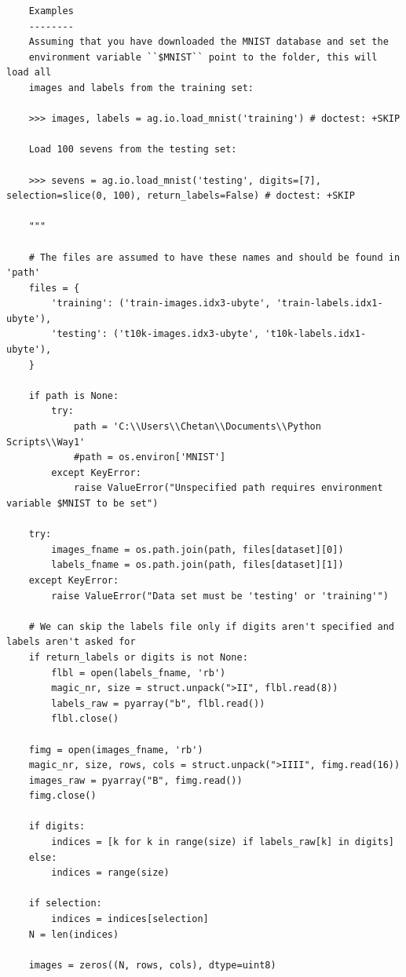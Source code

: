 \documentclass{article}
\begin{document}
\begin{lstlisting}
    Examples
    --------
    Assuming that you have downloaded the MNIST database and set the
    environment variable ``$MNIST`` point to the folder, this will load all
    images and labels from the training set:

    >>> images, labels = ag.io.load_mnist('training') # doctest: +SKIP

    Load 100 sevens from the testing set:    

    >>> sevens = ag.io.load_mnist('testing', digits=[7], selection=slice(0, 100), return_labels=False) # doctest: +SKIP

    """

    # The files are assumed to have these names and should be found in 'path'
    files = {
        'training': ('train-images.idx3-ubyte', 'train-labels.idx1-ubyte'),
        'testing': ('t10k-images.idx3-ubyte', 't10k-labels.idx1-ubyte'),
    }

    if path is None:
        try:
            path = 'C:\\Users\\Chetan\\Documents\\Python Scripts\\Way1'
            #path = os.environ['MNIST']
        except KeyError:
            raise ValueError("Unspecified path requires environment variable $MNIST to be set")

    try:
        images_fname = os.path.join(path, files[dataset][0])
        labels_fname = os.path.join(path, files[dataset][1])
    except KeyError:
        raise ValueError("Data set must be 'testing' or 'training'")

    # We can skip the labels file only if digits aren't specified and labels aren't asked for
    if return_labels or digits is not None:
        flbl = open(labels_fname, 'rb')
        magic_nr, size = struct.unpack(">II", flbl.read(8))
        labels_raw = pyarray("b", flbl.read())
        flbl.close()

    fimg = open(images_fname, 'rb')
    magic_nr, size, rows, cols = struct.unpack(">IIII", fimg.read(16))
    images_raw = pyarray("B", fimg.read())
    fimg.close()

    if digits:
        indices = [k for k in range(size) if labels_raw[k] in digits]
    else:
        indices = range(size)

    if selection:
        indices = indices[selection] 
    N = len(indices)

    images = zeros((N, rows, cols), dtype=uint8)


\end{lstlisting}
\end{document}
